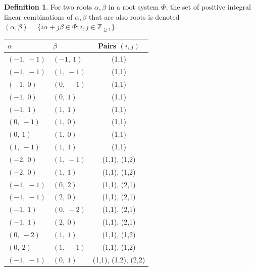 \documentclass[11pt]{article}
\newcommand{\noi}{\noindent}
\theoremstyle{definition}
\newtheorem{definition}{Definition}[section]
\begin{document}
\begin{definition}
For two roots $\alpha, \beta$ in a root system $\Phi$, the set of positive integral linear combinations of $\alpha, \beta$ that are also roots is denoted
\(
	(\alpha, \beta) = \{ i \alpha + j \beta \in \Phi : i, j \in \mathbb{Z}_{\ge 1} \}
\).
\end{definition}
\noi \noindent \begin{longtable}{|l|l|c|}
    \hline
    $\alpha$ & $\beta$ & Pairs $(i,j)$ \\
    \hline
    \endhead
    $\left( -1, \  -1\right)$ & $\left( -1, \  1\right)$ & (1,1) \\
    \hline
    $\left( -1, \  -1\right)$ & $\left( 1, \  -1\right)$ & (1,1) \\
    \hline
    $\left( -1, \  0\right)$ & $\left( 0, \  -1\right)$ & (1,1) \\
    \hline
    $\left( -1, \  0\right)$ & $\left( 0, \  1\right)$ & (1,1) \\
    \hline
    $\left( -1, \  1\right)$ & $\left( 1, \  1\right)$ & (1,1) \\
    \hline
    $\left( 0, \  -1\right)$ & $\left( 1, \  0\right)$ & (1,1) \\
    \hline
    $\left( 0, \  1\right)$ & $\left( 1, \  0\right)$ & (1,1) \\
    \hline
    $\left( 1, \  -1\right)$ & $\left( 1, \  1\right)$ & (1,1) \\
    \hline
    $\left( -2, \  0\right)$ & $\left( 1, \  -1\right)$ & (1,1), (1,2) \\
    \hline
    $\left( -2, \  0\right)$ & $\left( 1, \  1\right)$ & (1,1), (1,2) \\
    \hline
    $\left( -1, \  -1\right)$ & $\left( 0, \  2\right)$ & (1,1), (2,1) \\
    \hline
    $\left( -1, \  -1\right)$ & $\left( 2, \  0\right)$ & (1,1), (2,1) \\
    \hline
    $\left( -1, \  1\right)$ & $\left( 0, \  -2\right)$ & (1,1), (2,1) \\
    \hline
    $\left( -1, \  1\right)$ & $\left( 2, \  0\right)$ & (1,1), (2,1) \\
    \hline
    $\left( 0, \  -2\right)$ & $\left( 1, \  1\right)$ & (1,1), (1,2) \\
    \hline
    $\left( 0, \  2\right)$ & $\left( 1, \  -1\right)$ & (1,1), (1,2) \\
    \hline
    $\left( -1, \  -1\right)$ & $\left( 0, \  1\right)$ & (1,1), (1,2), (2,2) \\

\end{longtable}
\end{document}
